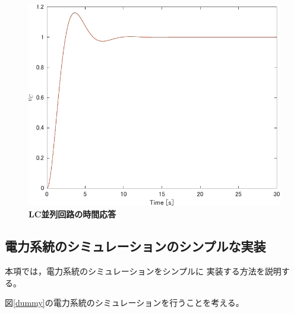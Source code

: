 {\begin{例}[簡単な例題]
\begin{figure}[t]
{\begin{minipage}{0.49\linewidth}
      \includegraphics[width = 1.0\linewidth]{figs/v_C}
    \end{minipage}
    \medskip
    \caption{\textbf{LC並列回路の時間応答}
    }
    \label{fig:solution_dae}
  }
  \medskip
\end{figure}
\end{例}
\subsection{電力系統のシミュレーションのシンプルな実装}
本項では，電力系統のシミュレーションをシンプルに
実装する方法を説明する。
\begin{例}[電力系統のシミュレーション]\label{ex:dae_ex2}
図\ref{dummy}の電力系統のシミュレーションを行うことを考える。

\end{例}


}